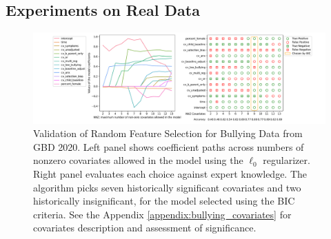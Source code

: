 \begin{table}[h]
\centering

\caption{\label{table:glmmlasso} Comparison of performance of MSR3-Fast for $\ell_1$ regularizer vs \texttt{glmmLasso}. MSR3-Fast executes 5 times faster in wall time and has higher accuracy of selecting correct covariates. 
}
\end{table}



\subsection{Experiments on Real Data}
\label{sec:real}

\begin{figure}
    \centering
	\caption{\label{fig:bullying_data_random_feature_selection}Validation of Random Feature Selection for Bullying Data from GBD 2020. 
	Left panel shows coefficient paths across numbers of nonzero covariates allowed in the model using the $\ell_0$ regularizer. 
	Right panel evaluates each choice against expert knowledge. 
	The algorithm picks seven historically significant covariates and two historically insignificant, for the model selected using the BIC criteria. 
	See the Appendix \ref{appendix:bullying_covariates} for covariates description and assessment of significance.}
	\includegraphics[width=1\textwidth]{figures/bullying_data_assessment_selection}
\end{figure}


